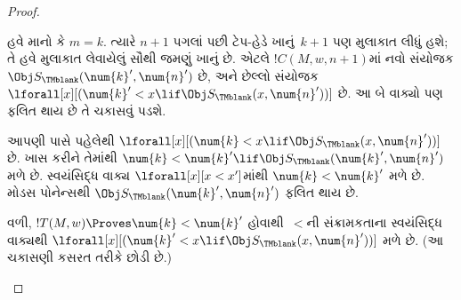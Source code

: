 \begin{proof}
\begin{enumerate}
હવે માનો કે $m=k$. ત્યારે $n+1$ પગલાં પછી
ટેપ-હેડે ખાનું~$k+1$ પણ મુલાકાત લીધું હશે;
તે હવે મુલાકાત લેવાયેલું સૌથી જમણું ખાનું છે.
એટલે $!C(M, w, n+1)$માં નવો સંયોજક
$\Obj S_\TMblank(\num{k}',\num{n}')$ છે, અને
છેલ્લો સંયોજક
$\lforall[x][(\num{k}' < x \lif \Obj S_\TMblank(x, \num{n}'))]$
છે. આ બે વાક્યો પણ ફલિત થાય છે તે
ચકાસવું પડશે.

આપણી પાસે પહેલેથી
$\lforall[x][(\num{k} < x \lif \Obj S_\TMblank(x,
  \num{n}'))]$ છે. ખાસ કરીને તેમાંથી
$\num{k} < \num{k}' \lif
\Obj S_\TMblank(\num{k}', \num{n}')$ મળે છે.
સ્વયંસિદ્ધ વાક્ય $\lforall[x][x < x']$માંથી
$\num{k} < \num{k}'$ મળે છે. મોડસ પોનેન્સથી
$\Obj S_\TMblank(\num{k}',\num{n}')$ ફલિત થાય છે.

વળી, $!T(M,w) \Proves \num{k} < \num{k}'$
હોવાથી~$<$ની સંક્રામકતાના સ્વયંસિદ્ધ વાક્યથી
$\lforall[x][(\num{k}' < x \lif \Obj
  S_\TMblank(x, \num{n}'))]$ મળે છે. (આ
ચકાસણી કસરત તરીકે છોડી છે.)


\end{enumerate}
\end{proof}
